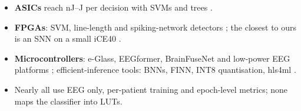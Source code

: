 \begin{itemize}
\item \textbf{ASICs} reach nJ--\textmu J per decision with SVMs and trees
  \cite{verma2010micro,altaf2015jssc,altaf2016tbcas,huang2020jssc,shoaran2018jetcas,shin2022neuraltree}.
\item \textbf{FPGAs}: SVM, line-length and spiking-network detectors
  \cite{wang2018access,elhosary2019tbcas,razi2022tbcas,vittimberga2025sensors,busia2025fpga}; the closest to ours is an SNN
  on a small iCE40 \cite{busia2025fpga}.
\item \textbf{Microcontrollers}: e-Glass, EEGformer, BrainFuseNet \cite{sopic2018eglass,busia2024eegformer,ingolfsson2024brainfusenet} and low-power EEG platforms \cite{kartsch2019biowolf,ingolfsson2022artifact};
  efficient-inference tools: BNNs, FINN, INT8 quantisation, hls4ml
  \cite{hubara2016bnn,umuroglu2017finn,jacob2018quant,duarte2018hls4ml}.
\item Nearly all use EEG only, per-patient training and epoch-level metrics; none maps the classifier into LUTs.
\end{itemize}

